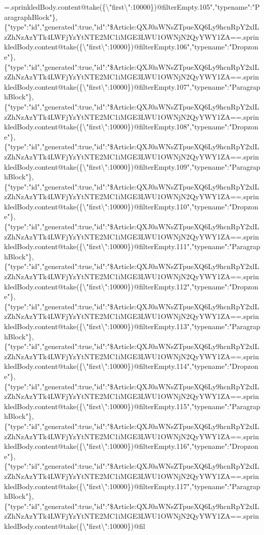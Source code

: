 =.sprinkledBody.content@take(\{\textbackslash{}"first\textbackslash{}":10000\})@filterEmpty.105","typename":"ParagraphBlock"\},\{"type":"id","generated":true,"id":"\$Article:QXJ0aWNsZTpueXQ6Ly9hcnRpY2xlLzZhNzAzYTk4LWFjYzYtNTE2MC1iMGE3LWU1OWNjN2QyYWY1ZA==.sprinkledBody.content@take(\{\textbackslash{}"first\textbackslash{}":10000\})@filterEmpty.106","typename":"Dropzone"\},\{"type":"id","generated":true,"id":"\$Article:QXJ0aWNsZTpueXQ6Ly9hcnRpY2xlLzZhNzAzYTk4LWFjYzYtNTE2MC1iMGE3LWU1OWNjN2QyYWY1ZA==.sprinkledBody.content@take(\{\textbackslash{}"first\textbackslash{}":10000\})@filterEmpty.107","typename":"ParagraphBlock"\},\{"type":"id","generated":true,"id":"\$Article:QXJ0aWNsZTpueXQ6Ly9hcnRpY2xlLzZhNzAzYTk4LWFjYzYtNTE2MC1iMGE3LWU1OWNjN2QyYWY1ZA==.sprinkledBody.content@take(\{\textbackslash{}"first\textbackslash{}":10000\})@filterEmpty.108","typename":"Dropzone"\},\{"type":"id","generated":true,"id":"\$Article:QXJ0aWNsZTpueXQ6Ly9hcnRpY2xlLzZhNzAzYTk4LWFjYzYtNTE2MC1iMGE3LWU1OWNjN2QyYWY1ZA==.sprinkledBody.content@take(\{\textbackslash{}"first\textbackslash{}":10000\})@filterEmpty.109","typename":"ParagraphBlock"\},\{"type":"id","generated":true,"id":"\$Article:QXJ0aWNsZTpueXQ6Ly9hcnRpY2xlLzZhNzAzYTk4LWFjYzYtNTE2MC1iMGE3LWU1OWNjN2QyYWY1ZA==.sprinkledBody.content@take(\{\textbackslash{}"first\textbackslash{}":10000\})@filterEmpty.110","typename":"Dropzone"\},\{"type":"id","generated":true,"id":"\$Article:QXJ0aWNsZTpueXQ6Ly9hcnRpY2xlLzZhNzAzYTk4LWFjYzYtNTE2MC1iMGE3LWU1OWNjN2QyYWY1ZA==.sprinkledBody.content@take(\{\textbackslash{}"first\textbackslash{}":10000\})@filterEmpty.111","typename":"ParagraphBlock"\},\{"type":"id","generated":true,"id":"\$Article:QXJ0aWNsZTpueXQ6Ly9hcnRpY2xlLzZhNzAzYTk4LWFjYzYtNTE2MC1iMGE3LWU1OWNjN2QyYWY1ZA==.sprinkledBody.content@take(\{\textbackslash{}"first\textbackslash{}":10000\})@filterEmpty.112","typename":"Dropzone"\},\{"type":"id","generated":true,"id":"\$Article:QXJ0aWNsZTpueXQ6Ly9hcnRpY2xlLzZhNzAzYTk4LWFjYzYtNTE2MC1iMGE3LWU1OWNjN2QyYWY1ZA==.sprinkledBody.content@take(\{\textbackslash{}"first\textbackslash{}":10000\})@filterEmpty.113","typename":"ParagraphBlock"\},\{"type":"id","generated":true,"id":"\$Article:QXJ0aWNsZTpueXQ6Ly9hcnRpY2xlLzZhNzAzYTk4LWFjYzYtNTE2MC1iMGE3LWU1OWNjN2QyYWY1ZA==.sprinkledBody.content@take(\{\textbackslash{}"first\textbackslash{}":10000\})@filterEmpty.114","typename":"Dropzone"\},\{"type":"id","generated":true,"id":"\$Article:QXJ0aWNsZTpueXQ6Ly9hcnRpY2xlLzZhNzAzYTk4LWFjYzYtNTE2MC1iMGE3LWU1OWNjN2QyYWY1ZA==.sprinkledBody.content@take(\{\textbackslash{}"first\textbackslash{}":10000\})@filterEmpty.115","typename":"ParagraphBlock"\},\{"type":"id","generated":true,"id":"\$Article:QXJ0aWNsZTpueXQ6Ly9hcnRpY2xlLzZhNzAzYTk4LWFjYzYtNTE2MC1iMGE3LWU1OWNjN2QyYWY1ZA==.sprinkledBody.content@take(\{\textbackslash{}"first\textbackslash{}":10000\})@filterEmpty.116","typename":"Dropzone"\},\{"type":"id","generated":true,"id":"\$Article:QXJ0aWNsZTpueXQ6Ly9hcnRpY2xlLzZhNzAzYTk4LWFjYzYtNTE2MC1iMGE3LWU1OWNjN2QyYWY1ZA==.sprinkledBody.content@take(\{\textbackslash{}"first\textbackslash{}":10000\})@filterEmpty.117","typename":"ParagraphBlock"\},\{"type":"id","generated":true,"id":"\$Article:QXJ0aWNsZTpueXQ6Ly9hcnRpY2xlLzZhNzAzYTk4LWFjYzYtNTE2MC1iMGE3LWU1OWNjN2QyYWY1ZA==.sprinkledBody.content@take(\{\textbackslash{}"first\textbackslash{}":10000\})@fil